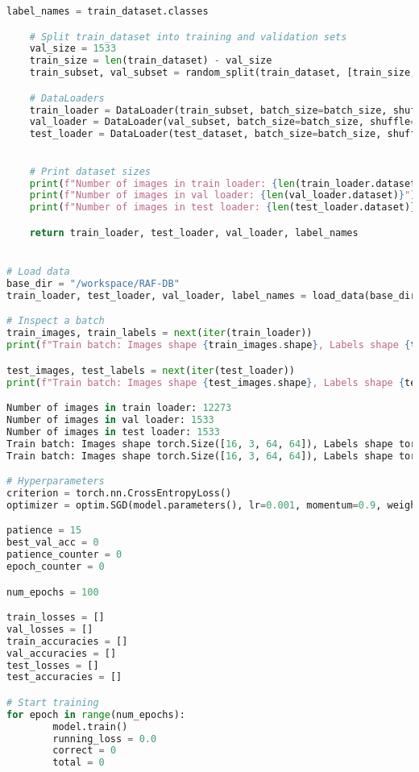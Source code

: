 \begin{lstlisting}[language=Python, caption={Python skript použitý na trenovanie modelu}, label={lst:emotion-recognition}]
    label_names = train_dataset.classes

    # Split train_dataset into training and validation sets
    val_size = 1533
    train_size = len(train_dataset) - val_size
    train_subset, val_subset = random_split(train_dataset, [train_size, val_size])

    # DataLoaders
    train_loader = DataLoader(train_subset, batch_size=batch_size, shuffle=True)
    val_loader = DataLoader(val_subset, batch_size=batch_size, shuffle=False)
    test_loader = DataLoader(test_dataset, batch_size=batch_size, shuffle=False)
    

    # Print dataset sizes
    print(f"Number of images in train loader: {len(train_loader.dataset)}")
    print(f"Number of images in val loader: {len(val_loader.dataset)}")
    print(f"Number of images in test loader: {len(test_loader.dataset)}")

    return train_loader, test_loader, val_loader, label_names


# Load data
base_dir = "/workspace/RAF-DB"
train_loader, test_loader, val_loader, label_names = load_data(base_dir=base_dir, batch_size=16, transform=transform)

# Inspect a batch
train_images, train_labels = next(iter(train_loader))
print(f"Train batch: Images shape {train_images.shape}, Labels shape {train_labels.shape}")

test_images, test_labels = next(iter(test_loader))
print(f"Train batch: Images shape {test_images.shape}, Labels shape {test_labels.shape}")

Number of images in train loader: 12273
Number of images in val loader: 1533
Number of images in test loader: 1533
Train batch: Images shape torch.Size([16, 3, 64, 64]), Labels shape torch.Size([16])
Train batch: Images shape torch.Size([16, 3, 64, 64]), Labels shape torch.Size([16])

# Hyperparameters
criterion = torch.nn.CrossEntropyLoss()
optimizer = optim.SGD(model.parameters(), lr=0.001, momentum=0.9, weight_decay=1e-4)

patience = 15
best_val_acc = 0
patience_counter = 0
epoch_counter = 0

num_epochs = 100

train_losses = []
val_losses = []
train_accuracies = []
val_accuracies = []
test_losses = []
test_accuracies = []

# Start training
for epoch in range(num_epochs):
        model.train()
        running_loss = 0.0
        correct = 0
        total = 0


\end{lstlisting}
